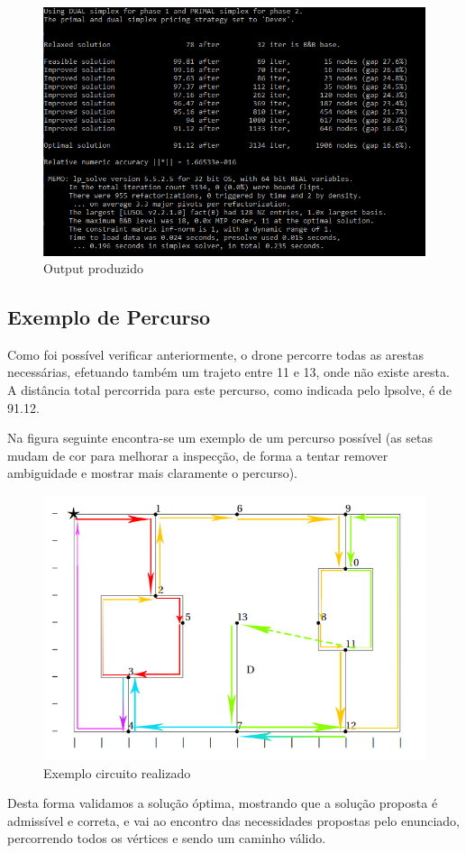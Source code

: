 \begin{figure}[h!]
\centering
\includegraphics[width=.85\textwidth]{images/main/outputLPSolve.png}
\caption{Output produzido}
\end{figure}

\subsection{Exemplo de Percurso}

Como foi possível verificar anteriormente, o drone percorre todas as arestas necessárias, efetuando também um trajeto entre 11 e 13, onde não existe aresta. A distância total percorrida para este percurso, como indicada pelo lpsolve, é de 91.12.

Na figura seguinte encontra-se um exemplo de um percurso possível (as setas mudam de cor para melhorar a inspecção, de forma a tentar remover ambiguidade e mostrar mais claramente o percurso).


\begin{figure}[h!]
\centering
\includegraphics[width=.85\textwidth]{images/main/circuitofinal.png}
\caption{Exemplo circuito realizado}
\end{figure}

Desta forma validamos a solução óptima, mostrando que a solução proposta é admissível e correta, e vai ao encontro das necessidades propostas pelo enunciado, percorrendo todos os vértices e sendo um caminho válido.
